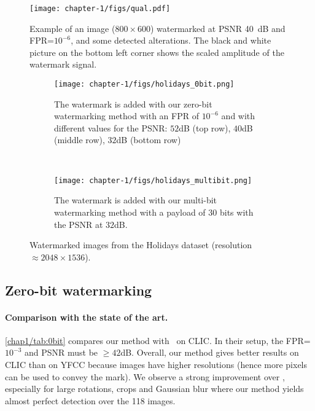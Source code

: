 \begin{figure}[b!]
    \centering
    \texttt{[image: chapter-1/figs/qual.pdf]}
    \caption{Example of an image ($800\times 600$) watermarked at PSNR 40~dB and FPR=$10^{-6}$, and some detected alterations. The black and white picture on the bottom left corner shows the scaled amplitude of the watermark signal.
    \label{chap1/fig:watermarked_imgs}}
\end{figure}


\begin{figure}[H]
    \centering
    \begin{subfigure}[b]{0.9\textwidth}
        \texttt{[image: chapter-1/figs/holidays\_0bit.png]}
        \caption{The watermark is added with our zero-bit watermarking method with an FPR of $10^{-6}$ and with different values for the PSNR: $52$dB (top row), $40$dB (middle row), $32$dB (bottom row)}
        \label{chap1/fig:holidays_0bit}
    \end{subfigure} \\[1em]
    \begin{subfigure}[b]{0.9\textwidth}
        \texttt{[image: chapter-1/figs/holidays\_multibit.png]}
        \caption{The watermark is added with our multi-bit watermarking method with a payload of $30$ bits with the PSNR at $32$dB.}
        \label{chap1/fig:holidays_multibit}
    \end{subfigure}
       \caption{Watermarked images from the Holidays dataset (resolution $\approx 2048 \times 1536$).}
       \label{chap1/fig:holidays}
\end{figure}






\subsection{Zero-bit watermarking}

\paragraph*{Comparison with the state of the art.} 
\autoref{chap1/tab:0bit} compares our method with~\citep{vukotic2020classification} on CLIC. 
In their setup, the FPR=$10^{-3}$ and PSNR must be $\geq 42$dB.
Overall, our method gives better results on CLIC than on YFCC because images have higher resolutions (hence more pixels can be used to convey the mark). We observe a strong improvement over \citep{vukotic2020classification}, especially for large rotations, crops and Gaussian blur where our method yields almost perfect detection over the 118 images. 

